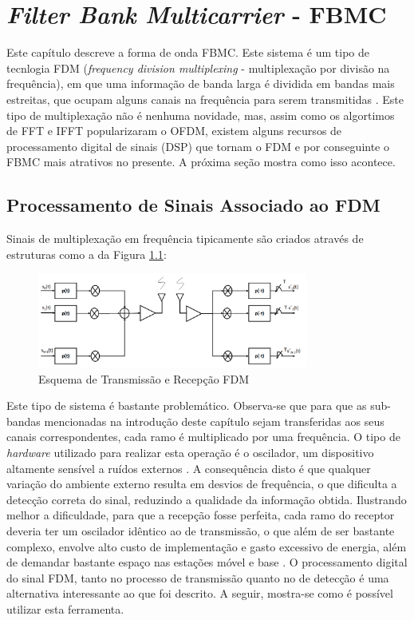 \chapter{\textit{Filter Bank Multicarrier} - FBMC} \label{capitulo3}

Este capítulo descreve a forma de onda FBMC. Este sistema é um tipo de tecnlogia FDM (\textit{frequency division multiplexing} - multiplexação por divisão na frequência), em que uma informação de banda larga é dividida em bandas mais estreitas, que ocupam alguns canais na frequência para serem transmitidas \cite{FDM}. Este tipo de multiplexação não é nenhuma novidade, mas, assim como os algortimos de FFT e IFFT popularizaram o OFDM, existem alguns recursos de processamento digital de sinais (DSP) que tornam o FDM e por conseguinte o FBMC mais atrativos no presente. A próxima seção mostra como isso acontece. 

\section{Processamento de Sinais Associado ao FDM}

\par Sinais de multiplexação em frequência tipicamente são criados através de estruturas como a da Figura \ref{trans_FDM}: 

\begin{figure}[h!]
\centering
\includegraphics[width=3.5in]{transceptor_FDM.png} %
\caption{Esquema de Transmissão e Recepção FDM}
\label{trans_FDM}
\end{figure}

\par Este tipo de sistema é bastante problemático. Observa-se que para que as sub-bandas mencionadas na introdução deste capítulo sejam transferidas aos seus canais correspondentes, cada ramo é multiplicado por uma frequência. O tipo de \textit{hardware} utilizado para realizar esta operação é o oscilador, um dispositivo altamente sensível a ruídos externos \cite{Boroujeny}. A consequência disto é que qualquer variação do ambiente externo resulta em desvios de frequência, o que dificulta a detecção correta do sinal, reduzindo a qualidade da informação obtida. Ilustrando melhor a dificuldade, para que a recepção fosse perfeita, cada ramo do receptor deveria ter um oscilador idêntico ao de transmissão, o que além de ser bastante complexo, envolve alto custo de implementação e gasto excessivo de energia, além de demandar bastante espaço nas estações móvel e base \cite{Krishna}.  O processamento digital do sinal FDM, tanto no processo de transmissão quanto no de detecção é uma alternativa interessante ao que foi descrito. A seguir, mostra-se como é possível utilizar esta ferramenta. 

